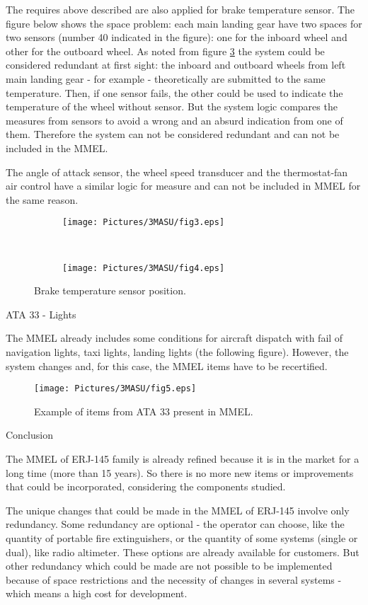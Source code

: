 The requires above described are also applied for brake temperature sensor. The figure below shows the space problem: each main landing gear have two spaces for two sensors (number 40 indicated in the figure): one for the inboard wheel and other for the outboard wheel. As noted from figure \ref{fig:breakEx3} the system could be considered redundant at first sight: the inboard and outboard wheels from left main landing gear - for example - theoretically are submitted to the same temperature. Then, if one sensor fails, the other could be used to indicate the temperature of the wheel without sensor. But the system logic compares the measures from sensors to avoid a wrong and an absurd indication from one of them. Therefore the system can not be considered redundant and can not be included in the MMEL.

The angle of attack sensor, the wheel speed transducer and the thermostat-fan air control have a similar logic for measure and can not be included in MMEL for the same reason.

\begin{figure}[H]
	\centering
    \begin{subfigure}[b]{0px}
            \texttt{[image: Pictures/3MASU/fig3.eps]}
            \label{fig:breakEx1}
    \end{subfigure}%
    \\
    \begin{subfigure}[b]{0px}
            \texttt{[image: Pictures/3MASU/fig4.eps]}
            \label{fig:breakEx2}
    \end{subfigure}%
    \caption{Brake temperature sensor position.}
	\label{fig:breakEx3}
\end{figure}

ATA 33 - Lights

The MMEL already includes some conditions for aircraft dispatch with fail of navigation lights, taxi lights, landing lights (the following figure). However, the system changes and, for this case, the MMEL items have to be recertified.

\begin{figure}[H]
	\centering
	\texttt{[image: Pictures/3MASU/fig5.eps]}
	\caption{Example of items from ATA 33 present in MMEL.}
	\label{fig:MMELExample3}
\end{figure}

Conclusion

The MMEL of ERJ-145 family is already refined because it is in the market for a long time (more than 15 years). So there is no more new items or improvements that could be incorporated, considering the components studied.

The unique changes that could be made in the MMEL of ERJ-145 involve only redundancy. Some redundancy are optional - the operator can choose, like the quantity of portable fire extinguishers, or the quantity of some systems (single or dual), like radio altimeter. These options are already available for customers. But other redundancy which could be made are not possible to be implemented because of space restrictions and the necessity of changes in several systems - which means a high cost for development.
